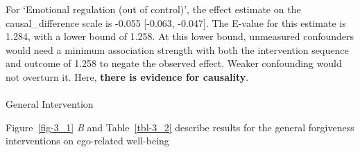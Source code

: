 \documentclass[
  single column]{article}
\makeatletter
\let\oldparagraph\paragraph
\renewcommand{\paragraph}{
    \@ifstar
      \xxxParagraphStar
      \xxxParagraphNoStar
  }
\newcommand{\xxxParagraphStar}[1]{\oldparagraph*{#1}\mbox{}}
\newcommand{\xxxParagraphNoStar}[1]{\oldparagraph{#1}\mbox{}}
\makeatother
\begin{document}
For `Emotional regulation (out of control)', the effect estimate on the
causal\_difference scale is -0.055 {[}-0.063, -0.047{]}. The E-value for
this estimate is 1.284, with a lower bound of 1.258. At this lower
bound, unmeasured confounders would need a minimum association strength
with both the intervention sequence and outcome of 1.258 to negate the
observed effect. Weaker confounding would not overturn it. Here,
\textbf{there is evidence for causality}.

\paragraph{General Intervention}\label{general-intervention-2}

Figure~\ref{fig-3_1} \emph{B} and Table~\ref{tbl-3_2} describe results
for the general forgiveness interventions on ego-related well-being
\end{document}
